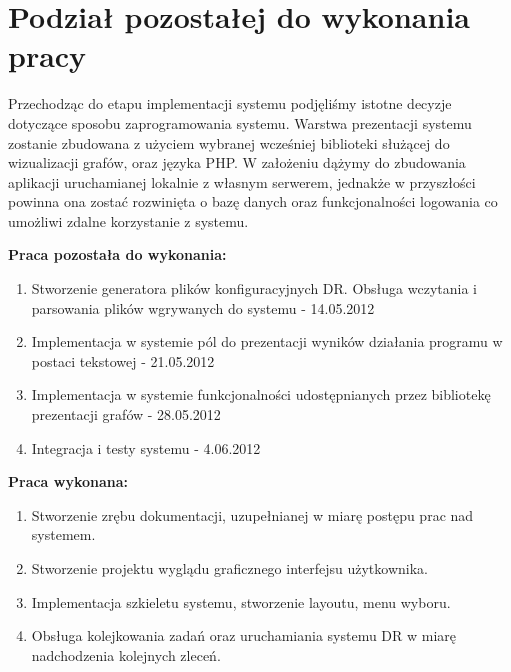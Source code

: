 \chapter{Podział pozostałej do wykonania pracy}
Przechodząc do etapu implementacji systemu podjęliśmy istotne decyzje dotyczące sposobu zaprogramowania systemu. Warstwa prezentacji systemu zostanie zbudowana z użyciem wybranej wcześniej biblioteki służącej do wizualizacji grafów, oraz języka PHP. W założeniu dążymy do zbudowania aplikacji uruchamianej lokalnie z własnym serwerem, jednakże w przyszłości powinna ona zostać rozwinięta o bazę danych oraz funkcjonalności logowania co umożliwi zdalne korzystanie z systemu. 


\textbf{Praca pozostała do wykonania:}

\begin{enumerate}
	\item Stworzenie generatora plików konfiguracyjnych DR. Obsługa wczytania i parsowania plików wgrywanych do systemu - 14.05.2012
	\item Implementacja w systemie pól do prezentacji wyników działania programu w postaci tekstowej - 21.05.2012
	\item Implementacja w systemie funkcjonalności udostępnianych przez bibliotekę prezentacji grafów - 28.05.2012
	\item Integracja i testy systemu - 4.06.2012
\end{enumerate}


\textbf{Praca wykonana:}

\begin{enumerate}
	\item Stworzenie zrębu dokumentacji, uzupełnianej w miarę postępu prac nad systemem.
	\item Stworzenie projektu wyglądu graficznego interfejsu użytkownika.
	\item Implementacja szkieletu systemu, stworzenie layoutu, menu wyboru.
	\item Obsługa kolejkowania zadań oraz uruchamiania systemu DR w miarę nadchodzenia kolejnych zleceń.
\end{enumerate}